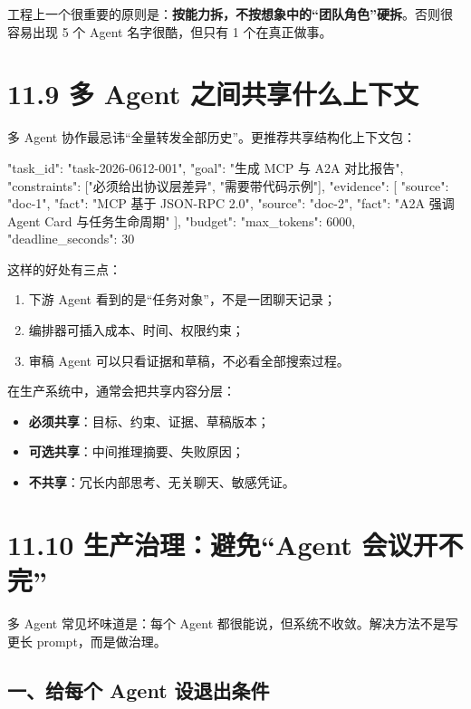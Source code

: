 工程上一个很重要的原则是：\textbf{按能力拆，不按想象中的``团队角色''硬拆}。否则很容易出现 5 个 Agent 名字很酷，但只有 1 个在真正做事。


\section{11.9 多 Agent 之间共享什么上下文}

多 Agent 协作最忌讳``全量转发全部历史''。更推荐共享结构化上下文包：


\begin{codeblock}
{
  "task_id": "task-2026-0612-001",
  "goal": "生成 MCP 与 A2A 对比报告",
  "constraints": ["必须给出协议层差异", "需要带代码示例"],
  "evidence": [
    {"source": "doc-1", "fact": "MCP 基于 JSON-RPC 2.0"},
    {"source": "doc-2", "fact": "A2A 强调 Agent Card 与任务生命周期"}
  ],
  "budget": {
    "max_tokens": 6000,
    "deadline_seconds": 30
  }
}
\end{codeblock}

这样的好处有三点：


\begin{enumerate}[leftmargin=2em]
\item 下游 Agent 看到的是``任务对象''，不是一团聊天记录；
\item 编排器可插入成本、时间、权限约束；
\item 审稿 Agent 可以只看证据和草稿，不必看全部搜索过程。
\end{enumerate}

在生产系统中，通常会把共享内容分层：


\begin{itemize}[leftmargin=2em]
\item \textbf{必须共享}：目标、约束、证据、草稿版本；
\item \textbf{可选共享}：中间推理摘要、失败原因；
\item \textbf{不共享}：冗长内部思考、无关聊天、敏感凭证。
\end{itemize}

\section{11.10 生产治理：避免``Agent 会议开不完''}

多 Agent 常见坏味道是：每个 Agent 都很能说，但系统不收敛。解决方法不是写更长 prompt，而是做治理。


\subsection{一、给每个 Agent 设退出条件}

